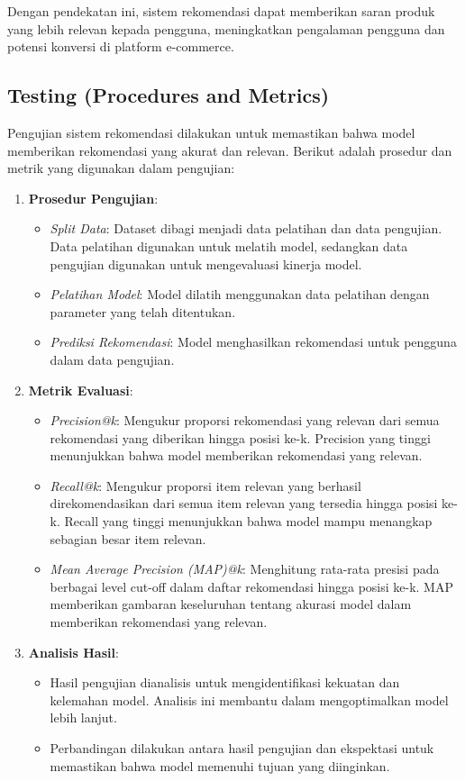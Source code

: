 \documentclass[journal,article,submit,pdftex,moreauthors]{Definitions/mdpi}
\begin{document}
Dengan pendekatan ini, sistem rekomendasi dapat memberikan saran produk yang lebih relevan kepada pengguna, meningkatkan pengalaman pengguna dan potensi konversi di platform e-commerce.



\subsection{Testing (Procedures and Metrics)}
Pengujian sistem rekomendasi dilakukan untuk memastikan bahwa model memberikan rekomendasi yang akurat dan relevan. Berikut adalah prosedur dan metrik yang digunakan dalam pengujian:

\begin{enumerate}
    \item \textbf{Prosedur Pengujian}:
    \begin{itemize}
        \item \textit{Split Data}: Dataset dibagi menjadi data pelatihan dan data pengujian. Data pelatihan digunakan untuk melatih model, sedangkan data pengujian digunakan untuk mengevaluasi kinerja model.
        \item \textit{Pelatihan Model}: Model dilatih menggunakan data pelatihan dengan parameter yang telah ditentukan.
        \item \textit{Prediksi Rekomendasi}: Model menghasilkan rekomendasi untuk pengguna dalam data pengujian.
    \end{itemize}

    \item \textbf{Metrik Evaluasi}:
    \begin{itemize}
        \item \textit{Precision@k}: Mengukur proporsi rekomendasi yang relevan dari semua rekomendasi yang diberikan hingga posisi ke-k. Precision yang tinggi menunjukkan bahwa model memberikan rekomendasi yang relevan.
        \item \textit{Recall@k}: Mengukur proporsi item relevan yang berhasil direkomendasikan dari semua item relevan yang tersedia hingga posisi ke-k. Recall yang tinggi menunjukkan bahwa model mampu menangkap sebagian besar item relevan.
        \item \textit{Mean Average Precision (MAP)@k}: Menghitung rata-rata presisi pada berbagai level cut-off dalam daftar rekomendasi hingga posisi ke-k. MAP memberikan gambaran keseluruhan tentang akurasi model dalam memberikan rekomendasi yang relevan.
    \end{itemize}

    \item \textbf{Analisis Hasil}:
    \begin{itemize}
        \item Hasil pengujian dianalisis untuk mengidentifikasi kekuatan dan kelemahan model. Analisis ini membantu dalam mengoptimalkan model lebih lanjut.
        \item Perbandingan dilakukan antara hasil pengujian dan ekspektasi untuk memastikan bahwa model memenuhi tujuan yang diinginkan.
    \end{itemize}
\end{enumerate}
\end{document}
